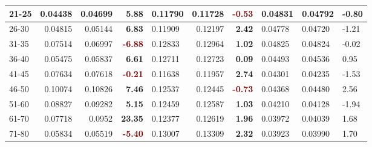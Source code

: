 \begin{table*}[h!]
\begin{tabular}{|l|r|r|r||l|r|r||l|l|l|}
        21-25   & 0.04438                                 & 0.04699                        & \textbf{\textcolor{OliveGreen}{5.88}}  & 0.11790 & 0.11728                  & \textbf{\textcolor{Maroon}{-0.53}}    & 0.04831 & 0.04792                & -0.80                  \\ \hline
        26-30   & 0.04815                                 & 0.05144                        & \textbf{\textcolor{OliveGreen}{6.83}}  & 0.11909 & 0.12197                  & \textbf{\textcolor{OliveGreen}{2.42}} & 0.04778 & 0.04720                & -1.21                  \\ \hline
        31-35   & 0.07514                                 & 0.06997                        & \textbf{\textcolor{Maroon}{-6.88}}     & 0.12833 & 0.12964                  & \textbf{\textcolor{OliveGreen}{1.02}} & 0.04825 & 0.04824                & -0.02                  \\ \hline
        36-40   & 0.05475                                 & 0.05837                        & \textbf{\textcolor{OliveGreen}{6.61}}  & 0.12711 & 0.12723                  & \textbf{\textcolor{OliveGreen}{0.09}} & 0.04493 & 0.04536                & 0.95                   \\ \hline
        41-45   & 0.07634                                 & 0.07618                        & \textbf{\textcolor{Maroon}{-0.21}}     & 0.11638 & 0.11957                  & \textbf{\textcolor{OliveGreen}{2.74}} & 0.04301 & 0.04235                & -1.53                  \\ \hline
        46-50   & 0.10074                                 & 0.10826                        & \textbf{\textcolor{OliveGreen}{7.46}}  & 0.12537 & 0.12445                  & \textbf{\textcolor{Maroon}{-0.73}}    & 0.04368 & 0.04480                & 2.56                   \\ \hline
        51-60   & 0.08827                                 & 0.09282                        & \textbf{\textcolor{OliveGreen}{5.15}}  & 0.12459 & 0.12587                  & \textbf{\textcolor{OliveGreen}{1.03}} & 0.04210 & 0.04128                & -1.94                  \\ \hline
        61-70   & 0.07718                                 & 0.0952                         & \textbf{\textcolor{OliveGreen}{23.35}} & 0.12377 & 0.12619                  & \textbf{\textcolor{OliveGreen}{1.96}} & 0.03972 & 0.04039                & 1.68                   \\ \hline
        71-80   & 0.05834                                 & 0.05519                        & \textbf{\textcolor{Maroon}{-5.40}}     & 0.13007 & 0.13309                  & \textbf{\textcolor{OliveGreen}{2.32}} & 0.03923 & 0.03990                & 1.70                   \\ \hline

\end{tabular}
\end{table*}
